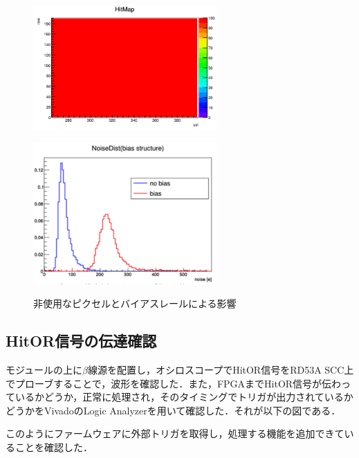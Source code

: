 \begin{figure}[h]
  \centering
  \begin{minipage}[b]{0.45\linewidth}
    \centering
    \includegraphics[width=7cm]{./figure/DigitalScan.png}
    \label{fig:enablemap}
  \end{minipage}
  \begin{minipage}[b]{0.45\linewidth}
    \centering
    \includegraphics[width=7cm]{./figure/noisedist.png}
    \label{fig:noisedist}
  \end{minipage}
  \caption{非使用なピクセルとバイアスレールによる影響}
\end{figure}


\subsection{HitOR信号の伝達確認}
モジュールの上に$\beta$線源を配置し，オシロスコープでHitOR信号をRD53A SCC上でプローブすることで，波形を確認した．また，FPGAまでHitOR信号が伝わっているかどうか，正常に処理され，そのタイミングでトリガが出力されているかどうかをVivadoのLogic Analyzerを用いて確認した．それが以下の図である．



このようにファームウェアに外部トリガを取得し，処理する機能を追加できていることを確認した．






